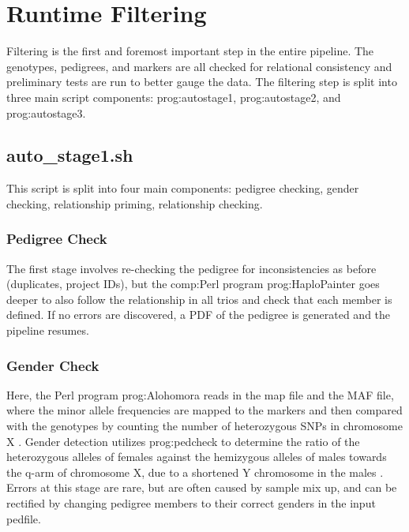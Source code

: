\section{Runtime Filtering}

Filtering is the first and foremost important step in the entire pipeline. The genotypes, pedigrees, and markers are all checked for relational consistency and preliminary tests are run to better gauge the data. The filtering step is split into three main script components: \gls{prog:autostage1}, \gls{prog:autostage2}, and \gls{prog:autostage3}.

\subsection{auto\_stage1.sh}

This script is split into four main components: pedigree checking, gender checking, relationship priming, relationship checking.

\subsubsection{Pedigree Check}

The first stage involves re-checking the pedigree for inconsistencies as before (duplicates, project IDs), but the \gls{comp:Perl} program \gls{prog:HaploPainter} goes deeper to also follow the relationship in all trios and check that each member is defined. If no errors are discovered, a PDF of the pedigree is generated and the pipeline resumes.

\subsubsection{Gender Check}

Here, the Perl program \gls{prog:Alohomora} reads in the map file and the MAF file, where the minor allele frequencies are mapped to the markers and then compared with the genotypes by counting the number of heterozygous SNPs in chromosome X \cite{ruschendorf2005alohomora}. Gender detection utilizes \gls{prog:pedcheck} to determine the ratio of the heterozygous alleles of females against the hemizygous alleles of males towards the q-arm of chromosome X, due to a shortened Y chromosome in the males \cite{o1998pedcheck}. Errors at this stage are rare, but are often caused by sample mix up, and can be rectified by changing pedigree members to their correct genders in the input pedfile.

